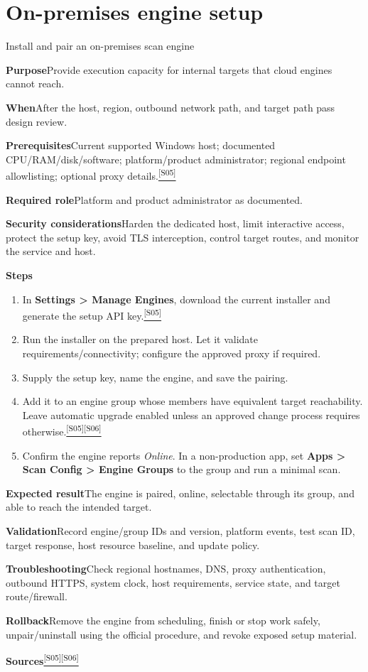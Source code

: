 \documentclass[11pt,letterpaper,oneside]{scrreprt}
\newcommand{\src}[1]{\hyperref[src:#1]{\textsuperscript{\color{R7Orange}[#1]}}}
\newcommand{\uipath}[1]{\textsf{\textbf{#1}}}
\newcommand{\field}[1]{\par\smallskip\noindent\textbf{#1}\quad}
\begin{document}
\section{On-premises engine setup}
\begin{procedure}{Install and pair an on-premises scan engine}
\field{Purpose}Provide execution capacity for internal targets that cloud engines cannot reach.
\field{When}After the host, region, outbound network path, and target path pass design review.
\field{Prerequisites}Current supported Windows host; documented CPU/RAM/disk/software; platform/product administrator; regional endpoint allowlisting; optional proxy details.\src{S05}
\field{Required role}Platform and product administrator as documented.
\field{Security considerations}Harden the dedicated host, limit interactive access, protect the setup key, avoid TLS interception, control target routes, and monitor the service and host.
\field{Steps}
\begin{enumerate}
  \item In \uipath{Settings > Manage Engines}, download the current installer and generate the setup API key.\src{S05}
  \item Run the installer on the prepared host. Let it validate requirements/connectivity; configure the approved proxy if required.
  \item Supply the setup key, name the engine, and save the pairing.
  \item Add it to an engine group whose members have equivalent target reachability. Leave automatic upgrade enabled unless an approved change process requires otherwise.\src{S05}\src{S06}
  \item Confirm the engine reports \emph{Online}. In a non-production app, set \uipath{Apps > Scan Config > Engine Groups} to the group and run a minimal scan.
\end{enumerate}
\field{Expected result}The engine is paired, online, selectable through its group, and able to reach the intended target.
\field{Validation}Record engine/group IDs and version, platform events, test scan ID, target response, host resource baseline, and update policy.
\field{Troubleshooting}Check regional hostnames, DNS, proxy authentication, outbound HTTPS, system clock, host requirements, service state, and target route/firewall.
\field{Rollback}Remove the engine from scheduling, finish or stop work safely, unpair/uninstall using the official procedure, and revoke exposed setup material.
\field{Sources}\src{S05}\src{S06}
\end{procedure}
\end{document}
